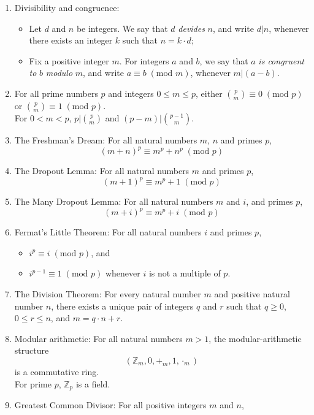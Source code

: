 \documentclass{article}
\begin{document}
\begin{enumerate}
    \item Divisibility and congruence:
        \begin{itemize}[topsep=0pt]
            \item Let $d$ and $n$ be integers. We say that $d$ \textit{devides} $n$, and write $d|n$, whenever there exists an integer $k$ such that $n=k\cdot d$;
            \item Fix a positive integer $m$. For integers $a$ and $b$, we say that $a$ \textit{is congruent to} $b$ \textit{modulo} $m$, and write $a\equiv b\;(\text{mod } m)$, whenever $m|(a-b)$.
        \end{itemize}
    \item For all prime numbers $p$ and integers $0\leq m\leq p$, either $\binom{p}{m}\equiv 0\;(\text{mod } p)$ or $\binom{p}{m}\equiv 1\;(\text{mod } p)$.\\
        For $0<m<p$, $p|\binom{p}{m}$ and $(p-m)|\binom{p-1}{m}$.
    \item The Freshman's Dream: For all natural numbers $m$, $n$ and primes $p$, 
        $$(m+n)^p\equiv m^p+n^p\;(\text{mod } p)$$
    \item The Dropout Lemma: For all natural numbers $m$ and primes $p$, 
        $$(m+1)^p\equiv m^p+1\;(\text{mod } p)$$
    \item The Many Dropout Lemma: For all natural numbers $m$ and $i$, and primes $p$,
        $$(m+i)^p\equiv m^p+i\;(\text{mod } p)$$
    \item Fermat's Little Theorem: For all natural numbers $i$ and primes $p$, 
        \begin{itemize}[topsep=0pt]
            \item $i^p\equiv i\;(\text{mod } p)$, and
            \item $i^{p-1}\equiv 1\;(\text{mod } p)$ whenever $i$ is not a multiple of $p$.
        \end{itemize}
    \item The Division Theorem: For every natural number $m$ and positive natural number $n$, there exists a unique pair of integers $q$ and $r$ such that $q\geq0$, $0\leq r\leq n$, and $m=q\cdot n+r$.
    \item Modular arithmetic: For all natural numbers $m>1$, the modular-arithmetic structure 
        $$(\mathbb{Z}_m,0,+_m,1,\cdot_m)$$
        is a commutative ring.\\
        For prime $p$, $\mathbb{Z}_p$ is a field.
    \item Greatest Common Divisor: For all positive integers $m$ and $n$,

\end{enumerate}
\end{document}
